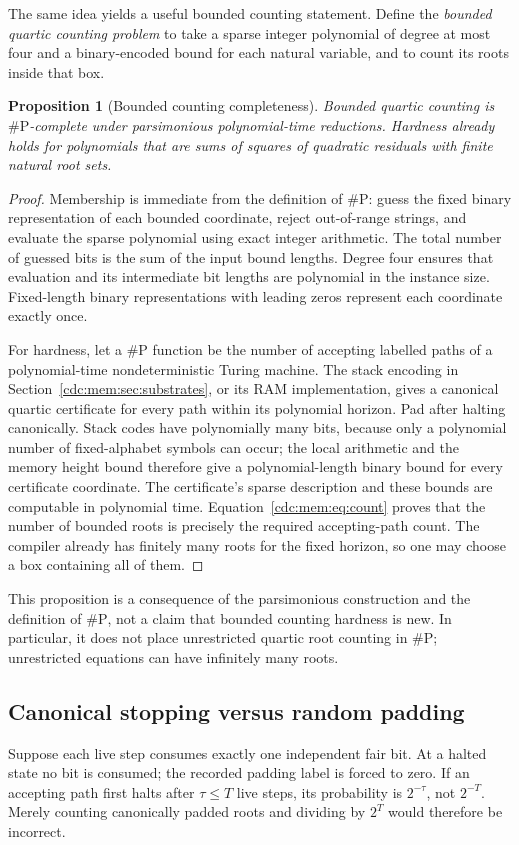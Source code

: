 \documentclass[11pt,a4paper]{article}
\newtheorem{proposition}[proposition]{Proposition}
\theoremstyle{definition}
\theoremstyle{remark}
\begin{document}
The same idea yields a useful bounded counting statement. Define the
\emph{bounded quartic counting problem} to take a sparse integer polynomial of
degree at most four and a binary-encoded bound for each natural variable, and
to count its roots inside that box.
\begin{proposition}[Bounded counting completeness]\label{cdc:mem:prop:counting}
Bounded quartic counting is $\#\mathrm P$-complete under parsimonious
polynomial-time reductions. Hardness already holds for polynomials that are
sums of squares of quadratic residuals with finite natural root sets.
\end{proposition}
\begin{proof}
Membership is immediate from the definition of $\#\mathrm P$: guess the fixed
binary representation of each bounded coordinate, reject out-of-range strings,
and evaluate the sparse polynomial using exact integer arithmetic. The total
number of guessed bits is the sum of the input bound lengths. Degree four
ensures that evaluation and its intermediate bit lengths are polynomial in
the instance size. Fixed-length binary representations with leading zeros
represent each coordinate exactly once.

For hardness, let a $\#\mathrm P$ function be the number of accepting labelled
paths of a polynomial-time nondeterministic Turing machine. The stack encoding
in Section~\ref{cdc:mem:sec:substrates}, or its RAM implementation, gives a canonical
quartic certificate for every path within its polynomial horizon. Pad after
halting canonically. Stack codes have polynomially many bits, because only a
polynomial number of fixed-alphabet symbols can occur; the local arithmetic
and the memory height bound therefore give a polynomial-length binary bound
for every certificate coordinate. The certificate's sparse description and
these bounds are computable in polynomial time. Equation~\eqref{cdc:mem:eq:count}
proves that the number of bounded roots is precisely the required accepting-path
count. The compiler already has finitely many roots for the fixed horizon, so
one may choose a box containing all of them.
\end{proof}
This proposition is a consequence of the parsimonious construction and the
definition of $\#\mathrm P$, not a claim that bounded counting hardness is new.
In particular, it does not place unrestricted quartic root counting in
$\#\mathrm P$; unrestricted equations can have infinitely many roots.

\subsection{Canonical stopping versus random padding}
Suppose each live step consumes exactly one independent fair bit. At a halted
state no bit is consumed; the recorded padding label is forced to zero. If an
accepting path first halts after $\tau\leq T$ live steps, its probability is
$2^{-\tau}$, not $2^{-T}$. Merely counting canonically padded roots and dividing
by $2^T$ would therefore be incorrect.
\end{document}

